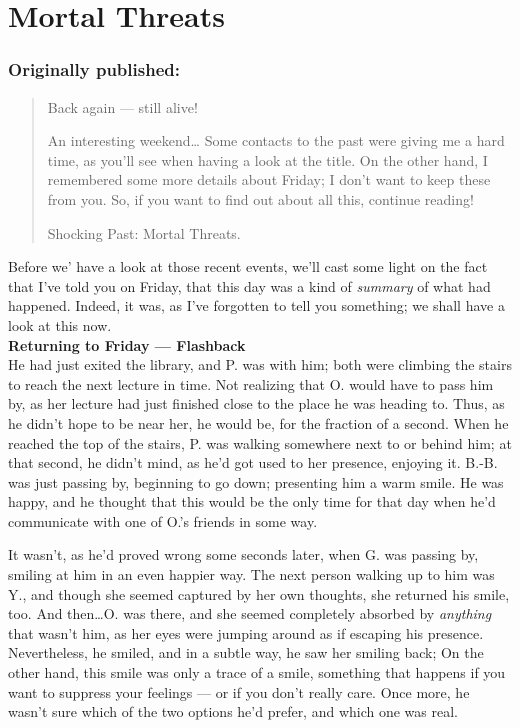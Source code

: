 \chapter{Mortal Threats}
\label{cha:mortal-threats}
\subsection*{Originally published: }
\begin{quote}
Back again --- still alive!

An interesting weekend\ldots
Some contacts to the past were giving me a hard time, as you'll see when having a look at the title. On the other hand, I remembered some more details about Friday; I don't want to keep these from you. 
So, if you want to find out about all this, continue reading!

Shocking Past: Mortal Threats.
\end{quote}

Before we' have a look at those recent events, we'll cast some light on the fact that I've told you on Friday, that this day was a kind of \emph{summary} of what had happened. Indeed, it was, as I've forgotten to tell you something; we shall have a look at this now. \\
\textbf{Returning to Friday --- Flashback}\\
He had just exited the library, and P. was with him; both were climbing the stairs to reach the next lecture in time. Not realizing that O. would have to pass him by, as her lecture had just finished close to the place he was heading to. 
Thus, as he didn't hope to be near her, he would be, for the fraction of a second. When he reached the top of the stairs, P. was walking somewhere next to or behind him; at that second, he didn't mind, as he'd got used to her presence, enjoying it. B.-B. was just passing by, beginning to go down; presenting him a warm smile. He was happy, and he thought that this would be the only time for that day when he'd communicate with one of O.'s friends in some way.

It wasn't, as he'd proved wrong some seconds later, when G. was passing by, smiling at him in an even happier way. The next person walking up to him was Y., and though she seemed captured by her own thoughts, she returned his smile, too. And then\ldots O. was there, and she seemed completely absorbed by \emph{anything} that wasn't him, as her eyes were jumping around as if escaping his presence. Nevertheless, he smiled, and in a subtle way, he saw her smiling back; On the other hand, this smile was only a trace of a smile, something that happens if you want to suppress your feelings --- or if you don't really care. 
Once more, he wasn't sure which of the two options he'd prefer, and which one was real.

